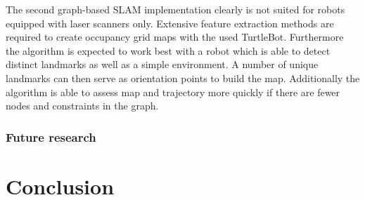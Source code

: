 \documentclass{ba-kecs}
\begin{document}
The second graph-based SLAM implementation \cite{Thrun} clearly is not suited for robots equipped with laser scanners only. Extensive feature extraction methods are required to create occupancy grid maps with the used TurtleBot. Furthermore the algorithm is expected to work best with a robot which is able to detect distinct landmarks as well as a simple environment. A number of unique landmarks can then serve as orientation points to build the map. Additionally the algorithm is able to assess map and trajectory more quickly if there are fewer nodes and constraints in the graph.

\subsubsection{Future research}

\section{Conclusion}


\nocite{*}
\onecolumn
\appendix
\end{document}
